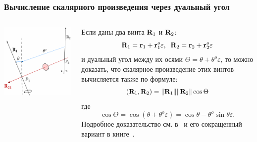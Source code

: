 \begin{frame}
  \frametitle{Вычисление скалярного произведения через дуальный угол}
  \begin{columns}
    \begin{column}{0.4\textwidth}
      \begin{center}
        \includegraphics{img/screws/moment06}
      \end{center}
    \end{column}
    \begin{column}{0.6\textwidth}
      Если даны два винта $\vb{R}_1$ и $\vb{R}_2$:
      \begin{equation*}
        \vb{R}_1 = \vb{r}_1 + \vb{r}^{o}_1 \varepsilon,\;\;
        \vb{R}_2 = \vb{r}_2 + \vb{r}^{o}_2 \varepsilon
      \end{equation*}
      и дуальный угол между их осями $\Theta = \theta + \theta^{o}\varepsilon$, то можно доказать, что скалярное произведение этих винтов вычисляется также по формуле:
      \begin{equation*}
        (\vb{R}_1, \vb{R}_2) = \norm{\vb{R}_1} \norm{\vb{R}_2} \cos \Theta 
      \end{equation*}
      где
      \begin{equation*}
        \cos \Theta = \cos (\theta + \theta^{o}\varepsilon) = \cos\theta - \theta^{o} \sin\theta \varepsilon.
      \end{equation*}
      Подробное доказательство см. в~\cite[46]{Dimentberg:1965} и его сокращенный вариант в книге~\cite[55]{Chelnokov:2006}.
    \end{column}
  \end{columns}
\end{frame}

